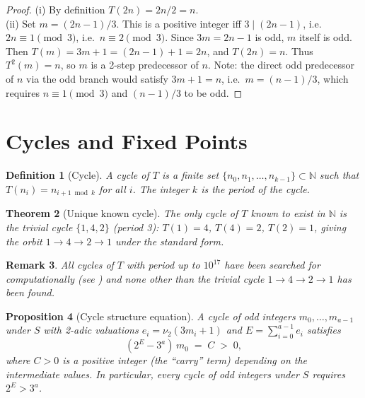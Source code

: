 \documentclass[12pt,a4paper]{article}
\newtheorem{theorem}{Theorem}[section]
\newtheorem{proposition}[theorem]{Proposition}
\newtheorem{definition}[theorem]{Definition}
\newtheorem{remark}[theorem]{Remark}
\begin{document}
\begin{proof}
(i) By definition $T(2n) = 2n/2 = n$.\\
(ii) Set $m = (2n-1)/3$. This is a positive integer iff $3 \mid (2n-1)$, i.e.\
$2n \equiv 1 \pmod{3}$, i.e.\ $n \equiv 2 \pmod{3}$. Since $3m = 2n-1$ is odd,
$m$ itself is odd. Then $T(m) = 3m + 1 = (2n-1) + 1 = 2n$, and $T(2n) = n$.
Thus $T^2(m) = n$, so $m$ is a 2-step predecessor of $n$.
Note: the direct odd predecessor of $n$ via the odd branch would satisfy $3m + 1 = n$,
i.e.\ $m = (n-1)/3$, which requires $n \equiv 1 \pmod{3}$ and $(n-1)/3$ to be odd.
\end{proof}

\section{Cycles and Fixed Points}

\begin{definition}[Cycle]\label{def:cycle}
A \emph{cycle} of $T$ is a finite set $\{n_0, n_1, \ldots, n_{k-1}\} \subset \mathbb{N}$
such that $T(n_i) = n_{i+1 \bmod k}$ for all $i$. The integer $k$ is the \emph{period}
of the cycle.
\end{definition}

\begin{theorem}[Unique known cycle]\label{thm:cycle}
The only cycle of $T$ known to exist in $\mathbb{N}$ is the \emph{trivial cycle}
$\{1, 4, 2\}$ (period 3): $T(1) = 4$, $T(4) = 2$, $T(2) = 1$, giving the
orbit $1 \to 4 \to 2 \to 1$ under the standard form.
\end{theorem}

\begin{remark}\label{rem:cycle_search}
All cycles of $T$ with period up to $10^{17}$ have been searched for computationally
(see \cite{Leavens1992}) and none other than the trivial cycle $1 \to 4 \to 2 \to 1$
has been found.
\end{remark}

\begin{proposition}[Cycle structure equation]\label{prop:cycle_eq}
A cycle of odd integers $m_0, \ldots, m_{a-1}$ under $S$
with 2-adic valuations $e_i = \nu_2(3m_i + 1)$ and $E = \sum_{i=0}^{a-1} e_i$ satisfies
\begin{equation}\label{eq:cycle_cond}
  (2^E - 3^a)\, m_0 \;=\; C \;>\; 0,
\end{equation}
where $C > 0$ is a positive integer (the ``carry'' term) depending on the intermediate values.
In particular, every cycle of odd integers under $S$ requires $2^E > 3^a$.
\end{proposition}
\end{document}

